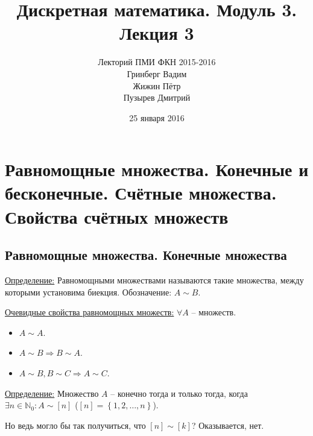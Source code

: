 \documentclass[a4paper, 12pt]{article}
\newcommand{\definition}{\underline{Определение:} }
\newcommand{\N}{\mathbb{N}}
\begin{document}
\title{Дискретная математика. Модуль 3. Лекция 3}
\author{Лекторий ПМИ ФКН 2015-2016\\Гринберг Вадим\\Жижин Пётр\\Пузырев Дмитрий}
\date{25 января 2016}

\maketitle
\section{Равномощные множества. Конечные и бесконечные. Счётные множества. Свойства счётных множеств}
\subsection*{Равномощные множества. Конечные множества}
\definition Равномощными множествами называются такие множества,
между которыми установима биекция. Обозначение: $A \sim B$.

\underline{Очевидные свойства равномощных множеств:} $\forall A$ -- множеств.
\begin{itemize}
        \item $A \sim A$.
        \item $A \sim B \Rightarrow B \sim A$.
        \item $A \sim B, B \sim C \Rightarrow A \sim C$.
\end{itemize}

\definition Множество $A$ -- конечно тогда и только тогда,
когда $\exists n \in \N_0: A \sim [n]$ ($[n] = \left\{ 1, 2, \ldots, n \right\}$).

Но ведь могло бы так получиться, что $[n] \sim [k]$? Оказывается, нет.
\end{document}
